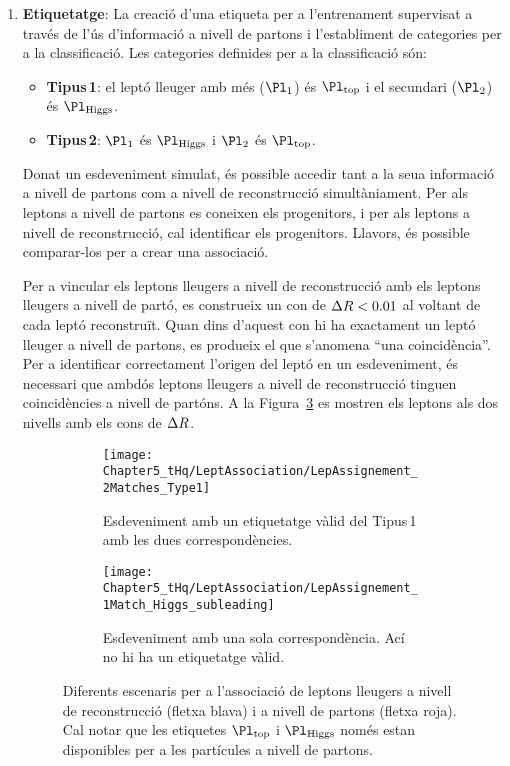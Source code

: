 \begin{enumerate}
	\item \textbf{Etiquetatge}: La creació d'una etiqueta per a l'entrenament supervisat a través de l'ús d'informació a nivell de partons
	i l'establiment de categories per a la classificació. Les categories definides per a la classificació són:
	\begin{itemize}
		\item \textbf{Tipus$\,$1}: el leptó lleuger amb més \pT ($\Pl_{1}$) és $\Pl_{\text{top}}$ i el secundari ($\Pl_{2}$) és $\Pl_{\text{Higgs}}$.
		\item \textbf{Tipus$\,$2}: $\Pl_{1}$ és $\Pl_{\text{Higgs}}$ i $\Pl_{2}$ és $\Pl_{\text{top}}$.
	\end{itemize}
	Donat un esdeveniment simulat, és possible accedir tant a la seua informació a nivell de partons com a 
	nivell de reconstrucció simultàniament. Per als leptons a nivell de partons es coneixen els progenitors, 
	i per als leptons a nivell de reconstrucció, cal identificar els progenitors. Llavors, és possible comparar-los 
	per a crear una associació.

	Per a vincular els leptons lleugers a nivell de reconstrucció amb els leptons lleugers a nivell de partó, es 
	construeix un con de $\Delta R<0.01$ al voltant de cada leptó reconstruït. Quan dins d'aquest con hi ha
	exactament un leptó lleuger a nivell de partons, es produeix el que s'anomena ``una coincidència''. 
	Per a identificar correctament l'origen del leptó en un esdeveniment, és necessari que ambdós leptons 
	lleugers a nivell de reconstrucció tinguen coincidències a nivell de partóns. 
	A la Figura~\ref{fig:resum:tH:LepAssign:Match} es mostren els leptons als dos nivells amb els
	cons de $\Delta R$.
	
	\begin{figure}[h]
	\centering
	\begin{subfigure}{.49\textwidth}
	  \centering
	  \texttt{[image: Chapter5\_tHq/LeptAssociation/LepAssignement\_2Matches\_Type1]}
	  \caption{Esdeveniment amb un etiquetatge vàlid del Tipus$\,$1 amb les dues correspondències.}
	  \label{fig:resum:tH:LepAssign:Match:Type1}
	\end{subfigure} 
	\begin{subfigure}{.49\textwidth}
	  \centering
	  \texttt{[image: Chapter5\_tHq/LeptAssociation/LepAssignement\_1Match\_Higgs\_subleading]}
	  \caption{Esdeveniment amb una sola correspondència. Ací no hi ha un etiquetatge vàlid.}
	  \label{fig:resum:tH:LepAssign:Match:Type2}
	\end{subfigure}
	\caption{Diferents escenaris per a l'associació de  leptons lleugers a nivell de reconstrucció (fletxa blava) i 
	a nivell de partons (fletxa roja). Cal notar que les etiquetes $\Pl_{\text{top}}$ i $\Pl_{\text{Higgs}}$ només 
	estan disponibles per a les partícules a nivell de partons.}
	\label{fig:resum:tH:LepAssign:Match}
	\end{figure}
	

\end{enumerate}
